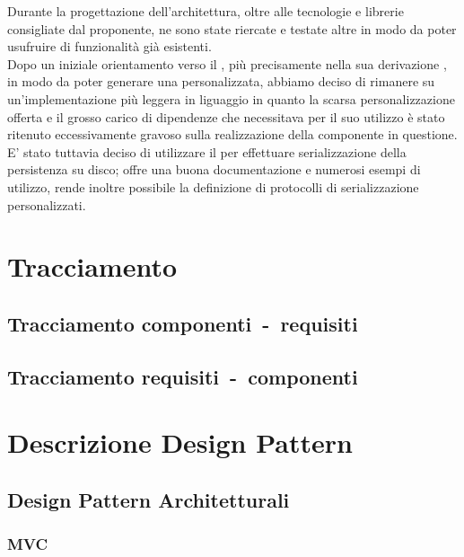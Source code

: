 \documentclass{scalatekids-article}
\begin{document}
Durante la progettazione dell'architettura, oltre alle tecnologie e librerie
consigliate dal proponente, ne sono state riercate e testate altre in modo da
poter usufruire di funzionalità già esistenti.\\ Dopo un iniziale orientamento
verso il  , più precisamente nella sua
derivazione , in modo da poter generare una 
personalizzata, abbiamo deciso di rimanere su un'implementazione più leggera in
liguaggio  in quanto la scarsa personalizzazione offerta e il
grosso carico di dipendenze che necessitava  per il suo
utilizzo è stato ritenuto eccessivamente gravoso sulla realizzazione della
componente in questione.\\ E' stato tuttavia deciso di utilizzare il
  per effettuare serializzazione della
persistenza su disco; offre una buona documentazione e numerosi esempi di
utilizzo, rende inoltre possibile la definizione di protocolli di
serializzazione personalizzati.

\section{Tracciamento}

\subsection{Tracciamento componenti\ -\ requisiti}

\subsection{Tracciamento requisiti\ -\ componenti}

\appendix
\label{sec:appendice}

\section{Descrizione Design Pattern}

\subsection{Design Pattern Architetturali}

\subsubsection{MVC}
\end{document}
